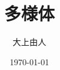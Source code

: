 \documentclass[a4paper,11pt]{jsarticle}
\numberwithin{equation}{section}
\begin{document}
\title{多様体}
\author{大上由人}
\date{\today}
\maketitle
\end{document}
